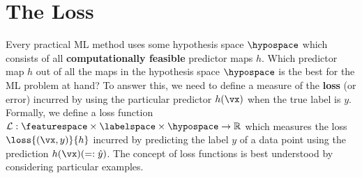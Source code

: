 \documentclass[12pt]{report}
\begin{document}

\section{The Loss}
\label{sec_lossfct}

Every practical ML method uses some hypothesis space $\hypospace$ 
which consists of all {\bf computationally feasible} predictor maps $h$. 
Which predictor map $h$ out of all the maps in the hypothesis space 
$\hypospace$ is the best for the ML problem at hand? To answer this, 
we need to define a measure of the {\bf loss} (or error) incurred by using 
the particular predictor $h(\vx)$ when the true label is $y$. Formally, 
we define a loss function $\mathcal{L}: \featurespace \times \labelspace \times \hypospace \rightarrow \mathbb{R}$ 
which measures the loss $\loss{(\vx,y)}{h}$ incurred by predicting the 
label $y$ of a data point using the prediction $h(\vx)(=: \hat{y})$. 
The concept of loss functions is best understood by considering 
particular examples. 
\end{document}
